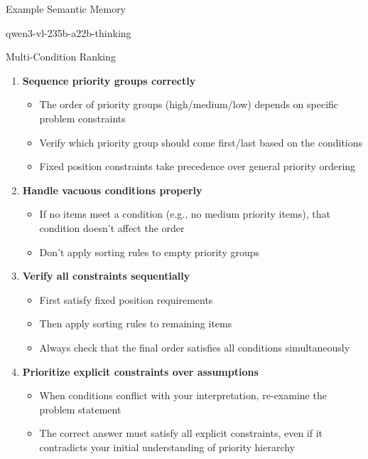 \begin{promptbox}{Example Semantic Memory

qwen3-vl-235b-a22b-thinking

Multi-Condition Ranking}
\begin{enumerate}[label=\textbf{\arabic*.}]
  \item \textbf{Sequence priority groups correctly}
    \begin{itemize}
      \item The order of priority groups (high/medium/low) depends on specific problem constraints
      \item Verify which priority group should come first/last based on the conditions
      \item Fixed position constraints take precedence over general priority ordering
    \end{itemize}

  \item \textbf{Handle vacuous conditions properly}
    \begin{itemize}
      \item If no items meet a condition (e.g., no medium priority items), that condition doesn't affect the order
      \item Don't apply sorting rules to empty priority groups
    \end{itemize}

  \item \textbf{Verify all constraints sequentially}
    \begin{itemize}
      \item First satisfy fixed position requirements
      \item Then apply sorting rules to remaining items
      \item Always check that the final order satisfies all conditions simultaneously
    \end{itemize}

  \item \textbf{Prioritize explicit constraints over assumptions}
    \begin{itemize}
      \item When conditions conflict with your interpretation, re-examine the problem statement
      \item The correct answer must satisfy all explicit constraints, even if it contradicts your initial understanding of priority hierarchy
    \end{itemize}

\end{enumerate}
\end{promptbox}


